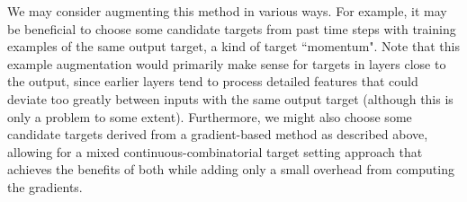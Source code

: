 \documentclass[12pt,letterpaper]{article}
\begin{document}
We may consider augmenting this method in various ways. For example, it may be beneficial to choose some candidate targets from past time steps with training examples of the same output target, a kind of target ``momentum". Note that this example augmentation would primarily make sense for targets in layers close to the output, since earlier layers tend to process detailed features that could deviate too greatly between inputs with the same output target (although this is only a problem to some extent). Furthermore, we might also choose some candidate targets derived from a gradient-based method as described above, allowing for a mixed continuous-combinatorial target setting approach that achieves the benefits of both while adding only a small overhead from computing the gradients.
\end{document}
